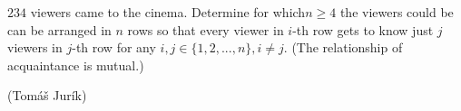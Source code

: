 $234$ viewers came to the cinema. Determine for which$ n \ge 4$ the viewers could be can be arranged in $n$ rows so that every viewer in $i$-th row gets to know just $j$ viewers in $j$-th row for any $i, j \in \{1, 2,... , n\}, i\ne j$. (The relationship of acquaintance is mutual.)

(Tomáš Jurík)